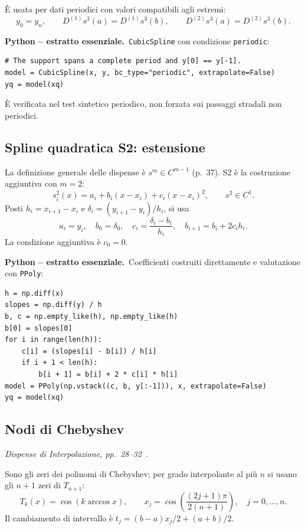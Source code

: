 \documentclass[11pt,a4paper]{article}
\newcommand{\slides}[1]{\textit{Dispense di Interpolazione, pp.~#1~\cite{dispense}.}}
\newcommand{\python}{\textbf{Python -- estratto essenziale.}}
\numberwithin{equation}{section}
\begin{document}
È usata per dati periodici con valori compatibili agli estremi:
\begin{equation}
 y_0=y_n,\qquad
 D^{(1)}s^3(a)=D^{(1)}s^3(b),\qquad
 D^{(2)}s^3(a)=D^{(2)}s^3(b).
\end{equation}

\python\ \texttt{CubicSpline} con condizione \texttt{periodic}:
\begin{lstlisting}
# The support spans a complete period and y[0] == y[-1].
model = CubicSpline(x, y, bc_type="periodic", extrapolate=False)
yq = model(xq)
\end{lstlisting}
È verificata nel test sintetico periodico, non forzata sui passaggi
stradali non periodici.

\subsection{Spline quadratica S2: estensione}
La definizione generale delle dispense è $s^m\in C^{m-1}$ (p.~37).
S2 è la costruzione aggiuntiva con $m=2$:
\begin{equation}
 s^2_i(x)=a_i+b_i(x-x_i)+c_i(x-x_i)^2,\qquad s^2\in C^1.
\end{equation}
Posti $h_i=x_{i+1}-x_i$ e $\delta_i=(y_{i+1}-y_i)/h_i$, si usa
\begin{equation}
 a_i=y_i,\quad b_0=\delta_0,\quad
 c_i=\frac{\delta_i-b_i}{h_i},\quad b_{i+1}=b_i+2c_i h_i.
\end{equation}
La condizione aggiuntiva è $c_0=0$.

\python\ Coefficienti costruiti direttamente e valutazione con \texttt{PPoly}:
\begin{lstlisting}
h = np.diff(x)
slopes = np.diff(y) / h
b, c = np.empty_like(h), np.empty_like(h)
b[0] = slopes[0]
for i in range(len(h)):
    c[i] = (slopes[i] - b[i]) / h[i]
    if i + 1 < len(h):
        b[i + 1] = b[i] + 2 * c[i] * h[i]
model = PPoly(np.vstack((c, b, y[:-1])), x, extrapolate=False)
yq = model(xq)
\end{lstlisting}

\subsection{Nodi di Chebyshev}
\slides{28--32}

Sono gli zeri dei polinomi di Chebyshev; per grado interpolante al più
$n$ si usano gli $n+1$ zeri di $T_{n+1}$:
\begin{equation}
 T_k(x)=\cos(k\arccos x),\qquad
 x_j=\cos\left(\frac{(2j+1)\pi}{2(n+1)}\right),\quad j=0,\ldots,n.
\end{equation}
Il cambiamento di intervallo è $t_j=(b-a)x_j/2+(a+b)/2$.
\end{document}
